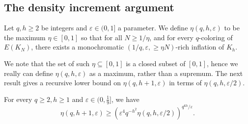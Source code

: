 \documentclass[11pt]{article}
\numberwithin{equation}{section}
\theoremstyle{plain}
\theoremstyle{remark}
\newcommand{\eps}{\ensuremath{\varepsilon}}
\begin{document}
\subsection{The density increment argument}
\begin{definition}
    Let $q,h \geq 2$ be integers and $\eps \in (0,1]$ a parameter. We define
    $\eta(q,h,\eps)$ to be the maximum $\eta \in [0,1]$ so that for all $N\geq 1/\eta$, and for every $q$-coloring of $E(K_N)$, there exists a monochromatic $(1/q,\eps,\ge \eta N)$-rich inflation of $K_h$.
\end{definition}
We note that the set of such $\eta \subseteq [0,1]$ is a closed subset of $[0,1]$, hence we really can define $\eta(q,h,\eps)$ as a maximum, rather than a supremum. The next result gives a recursive lower bound on $\eta(q,h+1,\eps)$ in terms of $\eta(q,h,\eps/2)$.
\begin{proposition}\label{prop:main increment}
    For every $q\geq 2,h \geq 1$ and $\eps \in (0,\frac 19]$, we have
    \[
    \eta(q,h+1,\eps) \geq \left(\eps^4 q^{-h^2} \eta(q,h,\eps/2)\right)^{q^{6h}/\eps}.
    \]
\end{proposition}
\end{document}
